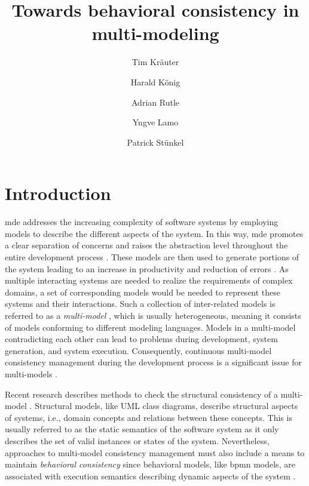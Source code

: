 \documentclass{jot}
\title{Towards behavioral consistency in multi-modeling}
\author[$\ast$]{Tim Kräuter}
\author[$\ast\dagger$]{Harald König}
\author[$\ast$]{Adrian Rutle}
\author[$\ast$]{Yngve Lamo}
\author[$\ddagger$]{Patrick Stünkel}
\affil[$\ast$]{Western Norway University of Applied Sciences, Bergen, Norway}
\affil[$\dagger$]{University of Applied Sciences, FHDW, Hannover, Germany}
\affil[$\ddagger$]{Haukeland Universitetssykehus, Bergen, Norway}
\begin{document}
    
\maketitle
{}

\section{Introduction} \label{sec:introduction}
\gls*{mde} addresses the increasing complexity of software systems by employing models to describe the different aspects of the system.
In this way, \gls*{mde} promotes a clear separation of concerns and raises the abstraction level throughout the entire development process \cite{franceModeldrivenDevelopmentComplex2007}.
These models are then used to generate portions of the system leading to an increase in productivity and reduction of errors \cite{brambillaModeldrivenSoftwareEngineering2017}.
As multiple interacting systems are needed to realize the requirements of complex domains, a set of corresponding models would be needed to represent these systems and their interactions.
Such a collection of inter-related models is referred to as a \emph{multi-model} \cite{boronatWhatMultimodelingLanguage2009, stunkelComprehensiveSystemsFormal2021}, which is usually heterogeneous, meaning it consists of models conforming to different modeling languages.
Models in a multi-model contradicting each other can lead to problems during development, system generation, and system execution.
Consequently, continuous multi-model consistency management during the development process is a significant issue for multi-models \cite{spanoudakisInconsistencyManagementSoftware2001, cicchettiMultiviewApproachesSoftware2019}.

Recent research describes methods to check the structural consistency of a multi-model \cite{stunkelComprehensiveSystemsFormal2021, klareCommonalitiesPreservingConsistency2019}.
Structural models, like UML class diagrams, describe structural aspects of systems, i.e., domain concepts and relations between these concepts.
This is usually referred to as the static semantics of the software system as it only describes the set of valid instances or states of the system.
Nevertheless, approaches to multi-model consistency management must also include a means to maintain \emph{behavioral consistency} since behavioral models, like \gls*{bpmn} models, are associated with execution semantics describing dynamic aspects of the system \cite{objectmanagementgroupUnifiedModelingLanguage2017, objectmanagementgroupBusinessProcessModel2013}.
\end{document}
